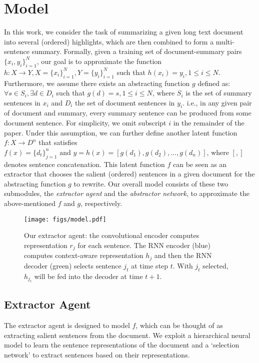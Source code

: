 \documentclass[11pt,a4paper]{article}
\begin{document}
\section{Model}
In this work, we consider the task of summarizing a given long text document
into several (ordered) highlights, which are then combined to form a multi-sentence summary.
Formally, given a training set of document-summary pairs $\{x_i, y_i\}_{i=1}^{N}$, 
our goal is to approximate the function
$h: X \rightarrow Y, X = \{x_i\}_{i=1}^N, Y = \{y_i\}_{i=1}^N$
such that $ h(x_i) = y_i, 1 \le i \le N $.
Furthermore, we assume there exists an abstracting function $g$ defined as:
$ \forall s \in S_i, \exists d \in D_i $
such that $ g(d) = s , 1 \le i \le N$,
where $S_i$ is the set of summary sentences in $x_i$ and
$D_i$ the set of document sentences in $y_i$.
i.e., in any given pair of document and summary, every summary sentence can be produced from some document sentence.
For simplicity, we omit subscript $i$ in the remainder of the paper.
Under this assumption, we can further define another latent function
$f: X \rightarrow D^n$ that satisfies
$ 
f(x) = \{d_t\}_{j=1}^n
\text{ and } 
y = h(x) = [g(d_1), g(d_2), \dots, g(d_n)]
$,
where $[,]$ denotes sentence concatenation.
This latent function $f$ can be seen as an extractor that chooses the salient (ordered) sentences in a given document for the abstracting function $g$ to rewrite.
Our overall model consists of these two submodules,
the \textit{extractor agent} and the \textit{abstractor network},
to approximate the above-mentioned $f$ and $g$, respectively.


\begin{figure*}
 \centering
 \texttt{[image: figs/model.pdf]}
 \vspace{-0.3cm}
 \caption{Our extractor agent: the convolutional encoder computes representation $r_j$ for each sentence. The RNN encoder (blue) computes context-aware representation $h_j$ and then the RNN decoder (green) selects sentence $j_t$ at time step $t$. With $j_t$ selected, $h_{j_t}$ will be fed into the decoder at time $t+1$. 
 }
 \vspace{-0.2cm}
 \label{fig:model}
\end{figure*}



\subsection{Extractor Agent}
The extractor agent is designed to model $f$, which can be thought of as extracting salient sentences from the document.
We exploit a hierarchical neural model to learn the sentence representations of the document and a `selection network' to extract sentences based on their representations.
\end{document}
